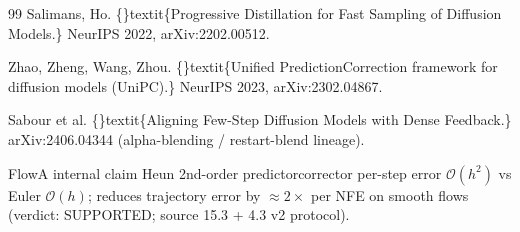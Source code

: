 \documentclass{article}
\begin{document}
\begin{thebibliography}{99}
 Salimans, Ho. \{\}textit\{Progressive Distillation for Fast Sampling of Diffusion Models.\} NeurIPS 2022, arXiv:2202.00512.

 Zhao, Zheng, Wang, Zhou. \{\}textit\{Unified PredictionCorrection framework for diffusion models (UniPC).\} NeurIPS 2023, arXiv:2302.04867.

 Sabour et al. \{\}textit\{Aligning Few-Step Diffusion Models with Dense Feedback.\} arXiv:2406.04344 (alpha-blending / restart-blend lineage).

 FlowA internal claim  Heun 2nd-order predictorcorrector per-step error $\mathcal{O}(h^2)$ vs Euler $\mathcal{O}(h)$; reduces trajectory error by $\approx 2\times$ per NFE on smooth flows (verdict: SUPPORTED; source  15.3 + 4.3 v2 protocol).

\end{thebibliography}
\end{document}
